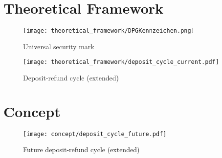 \begin{appendices}

\chapter{Theoretical Framework}
\label{app:theoreticalFramework}

\begin{figure}[hbt]
	\centering
  	\texttt{[image: theoretical\_framework/DPGKennzeichen.png]}
  	\caption[Universal security mark]{Universal security mark \cite{dpgKennzeichen}}
  	\label{fig:securityMark}
\end{figure}


\pagebreak

\begin{sidewaysfigure}[ht]
    \texttt{[image: theoretical\_framework/deposit\_cycle\_current.pdf]}
    \caption{Deposit-refund cycle (extended)}
	\label{fig:depositCycleCurrentExtended}
\end{sidewaysfigure}

\FloatBarrier

\chapter{Concept}
\label{app:concept}

\pagebreak

\begin{sidewaysfigure}[ht]
    \texttt{[image: concept/deposit\_cycle\_future.pdf]}
    \caption{Future deposit-refund cycle (extended)}
	\label{fig:depositCycleFutureExtended}
\end{sidewaysfigure}


\end{appendices}
